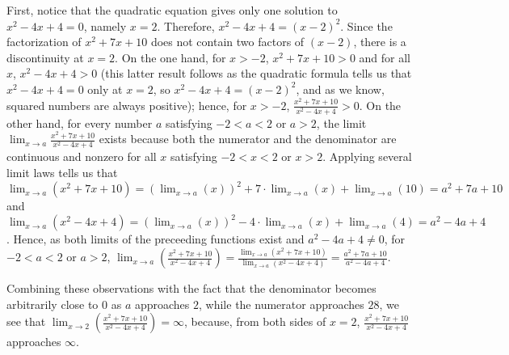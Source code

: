 \documentclass{ximera}
\begin{document}
\begin{exercise}
\begin{hint}
    First, notice that the quadratic equation gives only one solution to $x^2-4x+4=0$, namely $x=2$. Therefore, $x^2-4x+4=\left({x-2}\right)^2$. Since the factorization of $x^2+7x+10$ does not contain two factors of $\left({x-2}\right)$, there is a discontinuity at $x=2$. On the one hand, for $x>-2$, $x^2+7x+10>0$ and for all $x$, $x^2-4x+4>0$ (this latter result follows as the quadratic formula tells us that $x^2-4x+4=0$ only at $x=2$, so $x^2-4x+4=\left({x-2}\right)^2$, and as we know, squared numbers are always positive); hence, for $x>-2$, $\frac{x^2+7x+10}{x^2-4x+4}>0$. On the other hand, for every number $a$ satisfying $-2<a<2$ or $a>2$, the limit $\lim_{x\to a}\frac{x^2+7x+10}{x^2-4x+4}$ exists because both the numerator and the denominator are continuous and nonzero for all $x$ satisfying $-2<x<2$ or $x>2$. Applying several limit laws tells us that $\lim_{x\to a}\left({x^2+7x+10}\right)=\left({\lim_{x\to a}(x)}\right)^2+7\cdot\lim_{x\to a}(x)+\lim_{x\to a}\left({10}\right)=a^2+7a+10$ and $\lim_{x\to a}\left({x^2-4x+4}\right)=\left({\lim_{x\to a}(x)}\right)^2-4\cdot\lim_{x\to a}(x)+\lim_{x\to a}\left({4}\right)=a^2-4a+4$. Hence, as both limits of the preceeding functions exist and $a^2-4a+4\ne0$, for  $-2<a<2$ or $a>2$, $\lim_{x\to a}\left({\frac{x^2+7x+10}{x^2-4x+4}}\right)=\frac{\lim_{x\to a}\left({x^2+7x+10}\right)}{\lim_{x\to a}\left({x^2-4x+4}\right)}=\frac{a^2+7a+10}{a^2-4a+4}$.
    
    Combining these observations with the fact that the denominator becomes arbitrarily close to $0$ as $a$ approaches $2$, while the numerator approaches $28$, we see that $\lim_{x\to 2}\left({\frac{x^2+7x+10}{x^2-4x+4}}\right)=\infty$, because, from both sides of $x=2$, $\frac{x^2+7x+10}{x^2-4x+4}$ approaches $\infty$.
 \end{hint}
\end{exercise}
\end{document}
